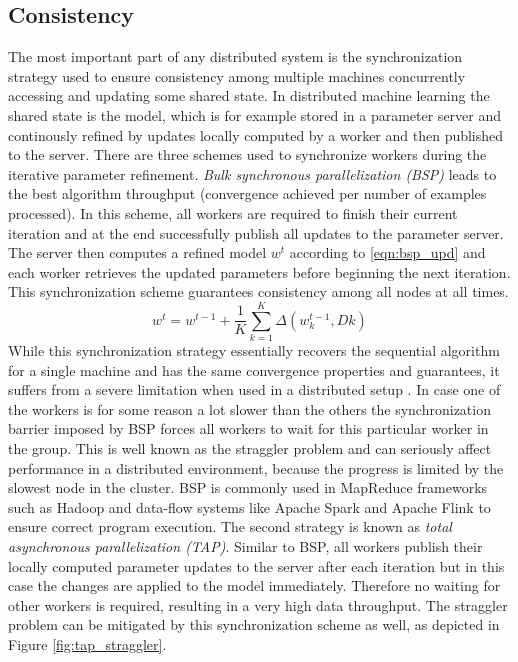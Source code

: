 \subsection{Consistency}
The most important part of any distributed system is the synchronization strategy used to ensure consistency among multiple machines concurrently accessing and updating some shared state.
In distributed machine learning the shared state is the model, which is for example stored in a parameter server and continously refined by updates locally computed by a worker and then published to the server.
There are three schemes used to synchronize workers during the iterative parameter refinement.
\textit{Bulk synchronous parallelization (BSP)} leads to the best algorithm throughput (convergence achieved per number of examples processed).
In this scheme, all workers are required to finish their current iteration and at the end successfully publish all updates to the parameter server.
The server then computes a refined model $w^t$ according to \ref{eqn:bsp_upd} and each worker retrieves the updated parameters before beginning the next iteration.
This synchronization scheme guarantees consistency among all nodes at all times.
\begin{equation}
w^{t} = w^{t-1} + \frac{1}{K}\sum_{k=1}^{K}\Delta(w^{t-1}_{k}, D{k})
\label{eqn:bsp_upd}
\end{equation}
While this synchronization strategy essentially recovers the sequential algorithm for a single machine and has the same convergence properties and guarantees, it suffers from a severe limitation when used in a distributed setup \cite{langford2009slow}.
In case one of the workers is for some reason a lot slower than the others the synchronization barrier imposed by BSP forces all workers to wait for this particular worker in the group.
This is well known as the straggler problem \cite{ananthanarayanan2013effective} and can seriously affect performance in a distributed environment, because the progress is limited by the slowest node in the cluster.
BSP is commonly used in MapReduce frameworks such as Hadoop and data-flow systems like Apache Spark and Apache Flink to ensure correct program execution.
The second strategy is known as \textit{total asynchronous parallelization (TAP)}.
Similar to BSP, all workers publish their locally computed parameter updates to the server after each iteration but in this case the changes are applied to the model immediately.
Therefore no waiting for other workers is required, resulting in a very high data throughput.
The straggler problem can be mitigated by this synchronization scheme as well, as depicted in Figure \ref{fig:tap_straggler}.
